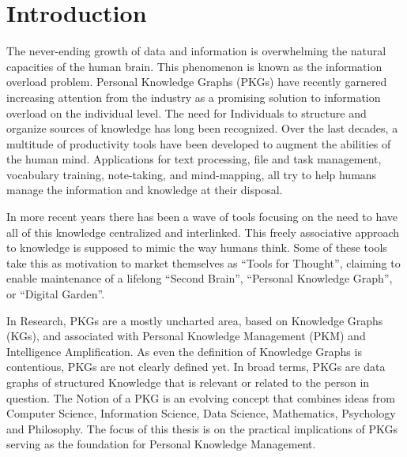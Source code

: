 \chapter{Introduction} \label{ch:introduction}
The never-ending growth of data and information is overwhelming the natural capacities of the human brain. This phenomenon is known as the information overload problem. Personal Knowledge Graphs (PKGs) have recently garnered increasing attention from the industry as a promising solution to information overload on the individual level. The need for Individuals to structure and organize sources of knowledge has long been recognized. Over the last decades, a multitude of productivity tools have been developed to augment the abilities of the human mind. Applications for text processing, file and task management, vocabulary training, note-taking, and mind-mapping, all try to help humans manage the information and knowledge at their disposal. 


In more recent years there has been a wave of tools focusing on the need to have all of this knowledge centralized and interlinked. This freely associative approach to knowledge is supposed to mimic the way humans think. Some of these tools take this as motivation to market themselves as “Tools for Thought”, claiming to enable maintenance of a lifelong “Second Brain”, “Personal Knowledge Graph”, or “Digital Garden”.

In Research, PKGs are a mostly uncharted area, based on Knowledge Graphs (KGs), and associated with Personal Knowledge Management (PKM) and Intelligence Amplification. As even the definition of Knowledge Graphs is contentious, PKGs are not clearly defined yet. In broad terms, PKGs are data graphs of structured Knowledge that is relevant or related to the person in question. The Notion of a PKG is an evolving concept that combines ideas from Computer Science, Information Science, Data Science, Mathematics, Psychology and Philosophy. The focus of this thesis is on the practical implications of PKGs serving as the foundation for Personal Knowledge Management.

